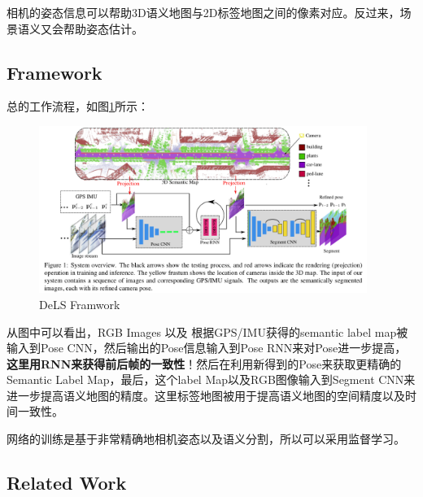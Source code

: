 相机的姿态信息可以帮助3D语义地图与2D标签地图之间的像素对应。反过来，场景语义又会帮助姿态估计。

\subsection{Framework}

总的工作流程，如图\ref{DeLSFramework}所示：
\begin{figure}
\centering
\includegraphics[width=0.95\textwidth]{SemanticSLAM/DeLS1.png}
\caption{DeLS Framwork}
\label{DeLSFramework}
\end{figure}

从图中可以看出，RGB Images 以及 根据GPS/IMU获得的semantic label map被输入到Pose CNN，然后输出的Pose信息输入到Pose RNN来对Pose进一步提高，{\bfseries 这里用RNN来获得前后帧的一致性}！然后在利用新得到的Pose来获取更精确的Semantic Label Map，最后，这个label Map以及RGB图像输入到Segment CNN来进一步提高语义地图的精度。这里标签地图被用于提高语义地图的空间精度以及时间一致性。

网络的训练是基于非常精确地相机姿态以及语义分割，所以可以采用监督学习。

\subsection{Related Work}

